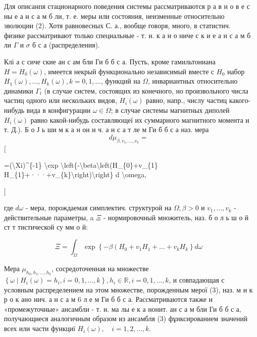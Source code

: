 \documentclass[10pt]{article}
\begin{document}
Для описанпя стационарного поведения системы рассматриваются р а в н о в е с ны е а н с а м б ли, т. е. меры или состояния, неизменные относительно эволюции (2). Хотя равновесных С. а., вообще говоря, много, в статистич. физике рассматривают только специальные - т. н. к а н о ниче с к и е а н с а м б ли $\Gamma$ и $\sigma$ б с а (распределения).



Клі а с сиче ские ан с ам бли Ги б б с а. Пусть, кроме гамильтониана $H=H_{0}(\omega)$, имеется некрый функционально независимый вместе с $H_{0}$ набор $H_{1}(\omega), \ldots, H_{k}(\omega), k=0,1, \ldots$, функций на $\Omega$, инвариантных относительно динамики $\Gamma_{t}$ (в случае систем, состоящих из конечного, но произвольного числа частиц одного или нескольких видов, $H_{i}(\omega)$ равно, напр., числу частиц какого-нибудь вида в конфигурации $\omega \in \Omega$; в случае системы магнитных диполей $H_{i}(\omega)$ равно какой-нибудь составляющеї их суммарного магнитного момента и т. Д.). Б о Ј ь ши м к а н он и ч. а н с а т ле м Ги б б с а наз. мера\[

d \mu_{\beta, v_{1}, \ldots, v_{k}}=

\][



=(\textbackslash Xi)\^{}\{-1\} \textbackslash exp \textbackslash left\{-\textbackslash beta\textbackslash left(H\_\{0\}+v\_\{1\} H\_\{1\}+···+v\_\{k\}\textbackslash right)\textbackslash right\} d \textbackslash omega,

]



где $d \omega$ - мера, порождаемая симплектич. структурой на $\Omega, \beta>0$ и $v_{1}, \ldots, v_{k}$ - действительные параметры, a $\Xi$ - нормировочный множитель, наз. б о л ь ш о й ст т тистической су мм о й:



\[

\Xi=\int_{\Omega} \exp \left\{-\beta\left(H_{0}+v_{1} H_{1}+\ldots+v_{k} H_{k}\right\} d \omega\right.

\]



Мера $\mu_{h_{0}, h_{1}, \ldots, h_{k}}$, сосредоточенная на множестве $\left\{\omega \mid H_{i}(\omega)=h_{i}, i=0,1, \ldots, k\right\}, h_{i} \in \mathbb{R}, i=0,1, \ldots, k$, и совпадающая с условным распределением на этом множестве, порожденным мерої (3), наз. м и к р о к ано нич. а н с а м 6 л е м Ги б б с а. Рассматриваются также и «промежуточные» ансамбли - т. н. ма лы е к а нонит. ан с а м бли Ги б б с а, получающиеся аналогичным образом из ансамбля (3) фұиксированием значений всех или части функциї $H_{i}(\omega), \quad i=1,2, \ldots, k$.
\end{document}
